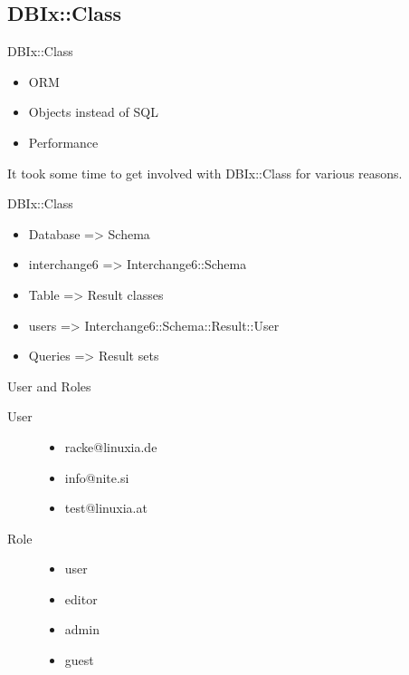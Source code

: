 \subsection{DBIx::Class}
\begin{frame}{DBIx::Class}
\begin{itemize}
\item ORM
\item Objects instead of SQL
\item Performance
\end{itemize}
\end{frame}

It took some time to get involved with DBIx::Class for various reasons.

\begin{frame}{DBIx::Class}
\begin{itemize}
\item Database => Schema
\item interchange6 => Interchange6::Schema
\end{itemize}
\begin{itemize}
\item Table => Result classes
\item users => Interchange6::Schema::Result::User
\end{itemize}
\begin{itemize}
\item Queries => Result sets
\end{itemize}
\end{frame}

\begin{frame}{User and Roles}
\begin{description}
\item[User]
\begin{itemize}
\item racke@linuxia.de
\item info@nite.si
\item test@linuxia.at
\end{itemize}
\item[Role]
\begin{itemize}
\item user
\item editor
\item admin
\item guest
\end{itemize}
\end{description}
\end{frame}

